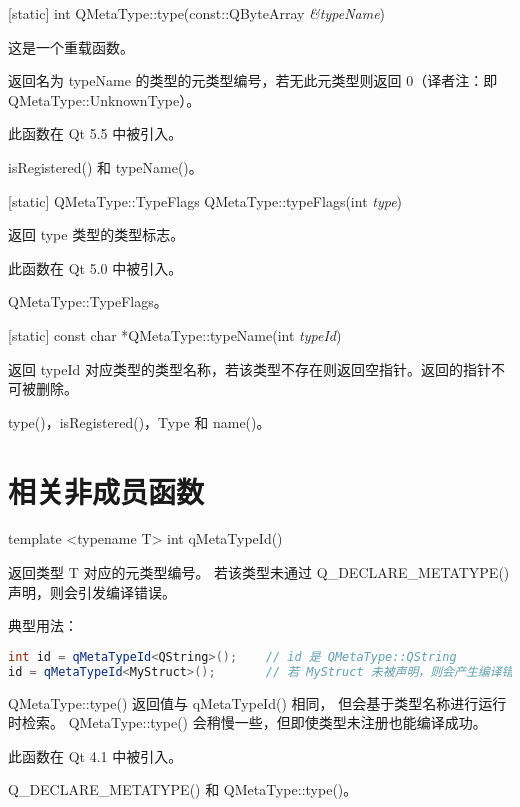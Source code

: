 [static] int QMetaType::type(const::QByteArray \emph{\&typeName})

这是一个重载函数。

返回名为 typeName 的类型的元类型编号，若无此元类型则返回 0（译者注：即QMetaType::UnknownType）。

此函数在 Qt 5.5 中被引入。

\begin{seeAlso}
isRegistered() 和 typeName()。
\end{seeAlso}

[static] QMetaType::TypeFlags QMetaType::typeFlags(int \emph{type})

返回 type 类型的类型标志。

此函数在 Qt 5.0 中被引入。

\begin{seeAlso}
QMetaType::TypeFlags。
\end{seeAlso}

[static] const char *QMetaType::typeName(int \emph{typeId})

返回 typeId 对应类型的类型名称，若该类型不存在则返回空指针。返回的指针不可被删除。

\begin{seeAlso}
type()，isRegistered()，Type 和 name()。
\end{seeAlso}

\section{相关非成员函数}

template <typename T> int qMetaTypeId()

返回类型 T 对应的元类型编号。
若该类型未通过 Q\_DECLARE\_METATYPE() 声明，则会引发编译错误。

典型用法：

\begin{lstlisting}[language=C++]
int id = qMetaTypeId<QString>();    // id 是 QMetaType::QString
id = qMetaTypeId<MyStruct>();       // 若 MyStruct 未被声明，则会产生编译错误
\end{lstlisting}

QMetaType::type() 返回值与 qMetaTypeId() 相同，
但会基于类型名称进行运行时检索。
QMetaType::type() 会稍慢一些，但即使类型未注册也能编译成功。

此函数在 Qt 4.1 中被引入。

\begin{seeAlso}
Q\_DECLARE\_METATYPE() 和 QMetaType::type()。
\end{seeAlso}

